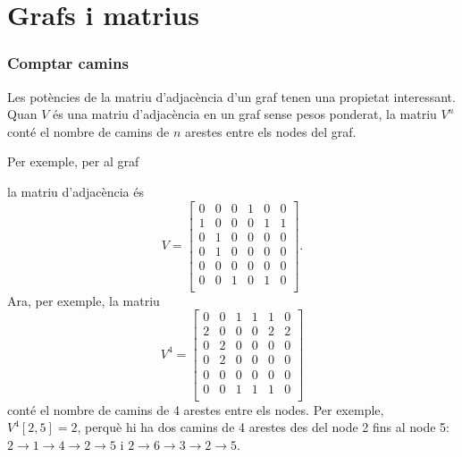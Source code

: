 \section{Grafs i matrius}

\subsubsection{Comptar camins}

Les potències de la matriu d'adjacència d'un graf tenen una propietat
interessant. Quan $V$ és una matriu d'adjacència en un graf sense
pesos ponderat, la matriu $V^n$ conté el nombre de camins de $n$
arestes entre els nodes del graf.

Per exemple, per al graf
\begin{center}
\end{center}
la matriu d'adjacència és
\[
V= \begin{bmatrix}
  0 & 0 & 0 & 1 & 0 & 0 \\
  1 & 0 & 0 & 0 & 1 & 1 \\
  0 & 1 & 0 & 0 & 0 & 0 \\
  0 & 1 & 0 & 0 & 0 & 0 \\
  0 & 0 & 0 & 0 & 0 & 0 \\
  0 & 0 & 1 & 0 & 1 & 0 \\
 \end{bmatrix}.
\]
Ara, per exemple, la matriu
\[
V^4= \begin{bmatrix}
  0 & 0 & 1 & 1 & 1 & 0 \\
  2 & 0 & 0 & 0 & 2 & 2 \\
  0 & 2 & 0 & 0 & 0 & 0 \\
  0 & 2 & 0 & 0 & 0 & 0 \\
  0 & 0 & 0 & 0 & 0 & 0 \\
  0 & 0 & 1 & 1 & 1 & 0 \\
 \end{bmatrix}
\]
conté el nombre de camins de 4 arestes entre els nodes. Per exemple,
$V^4[2,5]=2$, perquè hi ha dos camins de 4 arestes des del node 2 fins
al node 5: $2 \rightarrow 1 \rightarrow 4 \rightarrow 2 \rightarrow 5$
i $2 \rightarrow 6 \rightarrow 3 \rightarrow 2 \rightarrow 5$.

